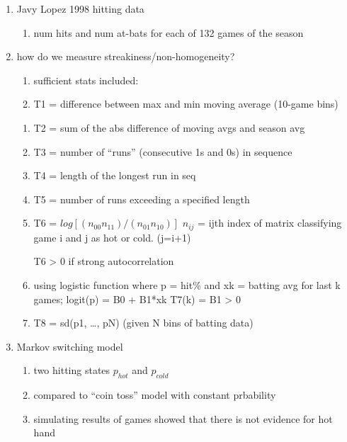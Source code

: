 \documentclass[12pt,twoside]{dukestatscithesis}
\providecommand{\tightlist}{%
  \setlength{\itemsep}{0pt}\setlength{\parskip}{0pt}}
\theoremstyle{definition}
\theoremstyle{definition}
\theoremstyle{definition}
\theoremstyle{remark}
\begin{document}
\begin{enumerate}
\def\labelenumi{\arabic{enumi}.}
\tightlist
\item
  Javy Lopez 1998 hitting data
  \begin{enumerate}
  \def\labelenumii{\alph{enumii}.}
  \tightlist
  \item
    num hits and num at-bats for each of 132 games of the season
  \end{enumerate}
\item
  how do we measure streakiness/non-homogeneity?
  \begin{enumerate}
  \def\labelenumii{\alph{enumii}.}
  \tightlist
  \item
    sufficient stats included:
  \item
    T1 = difference between max and min moving average (10-game bins)
  \end{enumerate}
  \begin{enumerate}
  \def\labelenumii{\roman{enumii}.}
  \setcounter{enumii}{1}
  \item
    T2 = sum of the abs difference of moving avgs and season avg
  \item
    T3 = number of ``runs'' (consecutive 1s and 0s) in sequence
  \item
    T4 = length of the longest run in seq
  \item
    T5 = number of runs exceeding a specified length
  \item
    T6 = \(log[(n_{00}n_{11})/(n_{01}n_{10})]\) \(n_{ij}\) = ijth index
    of matrix classifying game i and j as hot or cold. (j=i+1)

    T6 \textgreater{} 0 if strong autocorrelation
  \item
    using logistic function where p = hit\% and xk = batting avg for
    last k games; logit(p) = B0 + B1*xk T7(k) = B1 \textgreater{} 0
  \item
    T8 = sd(p1, \ldots{}, pN) (given N bins of batting data)
  \end{enumerate}
\item
  Markov switching model
  \begin{enumerate}
  \def\labelenumii{\alph{enumii}.}
  \tightlist
  \item
    two hitting states \(p_{hot}\) and \(p_{cold}\)
  \item
    compared to ``coin toss'' model with constant prbability
  \item
    simulating results of games showed that there is not evidence for
    hot hand
  \end{enumerate}
\end{enumerate}
\end{document}
